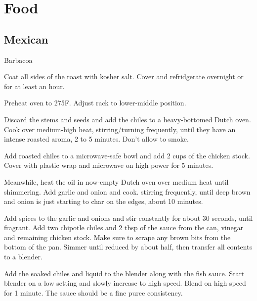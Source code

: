 \documentclass[]{article}
\begin{document}
\tableofcontents
\newpage


\section{Food}

\subsection{Mexican}

\begin{recipe}{Barbacoa}{}{}
	
	
	Coat all sides of the roast with kosher salt. Cover and refridgerate overnight or for at least an hour.
	
	\newstep
	Preheat oven to 275\0F. Adjust rack to lower-middle position.
	
	Discard the stems and seeds and add the chiles to a heavy-bottomed Dutch oven. Cook over medium-high heat, stirring/turning frequently, until they have an intense roasted aroma, 2 to 5 minutes. Don't allow to smoke.

	Add roasted chiles to a microwave-safe bowl and add 2 cups of the chicken stock. Cover with plastic wrap and microwave on high power for 5 minutes.

	Meanwhile, heat the oil in now-empty Dutch oven over medium heat until 
	shimmering. Add garlic and onion and cook. stirring frequently, until deep brown 
	and onion is just starting to char on the edges, about 10 minutes.

	Add spices to the garlic and onions and stir constantly for about 30 seconds, until fragrant.
	Add two chipotle chiles and 2 tbsp of the sauce from the can, vinegar and remaining chicken stock. Make sure to scrape any brown
	bits from the bottom of the pan. Simmer until reduced by about half, then transfer all contents to
	a blender.

	Add the soaked chiles and liquid to the blender along with the fish sauce. Start blender on a low
	setting and slowly increase to high speed. Blend on high speed for 1 minute. The sauce should be a fine
	puree consistency.


\end{recipe}
\end{document}
